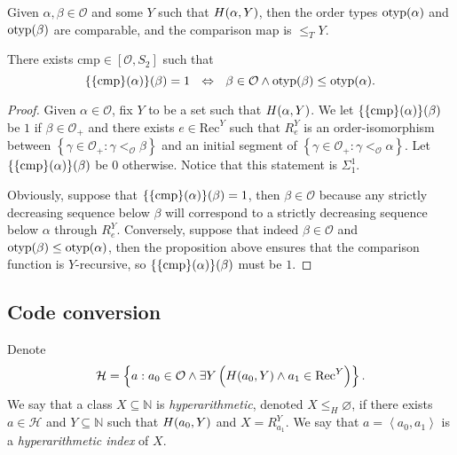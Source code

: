 \documentclass[11pt]{article}
\theoremstyle{plain}
\theoremstyle{definition}
\newcommand{\tuple}[1]{\left\langle #1 \right\rangle}
\newcommand{\Rec}{\mathrm{Rec}}
\DeclareMathOperator{\otyp}{otyp}
\begin{document}
\begin{proposition}
    Given $\alpha, \beta \in \mathcal{O}$ and some $Y$ such that $H\mleft(\alpha, Y\mright)$, then the order types $\otyp\mleft(\alpha\mright)$ and $\otyp\mleft(\beta\mright)$ are comparable, and the comparison map is $\leq_T Y$.
\end{proposition}

\begin{corollary}
    \label{cor:well-order-cmp}
    There exists $\mathrm{cmp} \in \left[\mathcal{O}, S_2\right]$ such that
    \[\mleft\{\mleft\{\mathrm{cmp}\mright\}\mleft(\alpha\mright)\mright\}\mleft(\beta\mright) = 1 \ \ \Leftrightarrow \ \ \beta \in \mathcal{O} \land \otyp\mleft(\beta\mright) \leq \otyp\mleft(\alpha\mright).\]
\end{corollary}

\begin{proof}
    Given $\alpha \in \mathcal{O}$, fix $Y$ to be a set such that $H\mleft(\alpha, Y\mright)$. We let $\mleft\{\mleft\{\mathrm{cmp}\mright\}\mleft(\alpha\mright)\mright\}\mleft(\beta\mright)$ be $1$ if $\beta \in \mathcal{O}_+$ and there exists $e \in \Rec^Y$ such that $R^Y_e$ is an order-isomorphism between $\left\{\gamma \in \mathcal{O}_+ : \gamma <_\mathcal{O} \beta\right\}$ and an initial segment of $\left\{\gamma \in \mathcal{O}_+ : \gamma <_\mathcal{O} \alpha\right\}$. Let $\mleft\{\mleft\{\mathrm{cmp}\mright\}\mleft(\alpha\mright)\mright\}\mleft(\beta\mright)$ be $0$ otherwise. Notice that this statement is $\Sigma^1_1$.

    Obviously, suppose that $\mleft\{\mleft\{\mathrm{cmp}\mright\}\mleft(\alpha\mright)\mright\}\mleft(\beta\mright) = 1$, then $\beta \in \mathcal{O}$ because any strictly decreasing sequence below $\beta$ will correspond to a strictly decreasing sequence below $\alpha$ through $R^Y_e$. Conversely, suppose that indeed $\beta \in \mathcal{O}$ and $\otyp\mleft(\beta\mright) \leq \otyp\mleft(\alpha\mright)$, then the proposition above ensures that the comparison function is $Y$-recursive, so $\mleft\{\mleft\{\mathrm{cmp}\mright\}\mleft(\alpha\mright)\mright\}\mleft(\beta\mright)$ must be $1$.
\end{proof}

\subsection{Code conversion}

Denote
\[\mathcal{H} = \left\{a : a_0 \in \mathcal{O} \land \exists Y \left(H\mleft(a_0, Y\mright) \land a_1 \in \Rec^Y\right)\right\}.\]
We say that a class $X \subseteq \mathbb{N}$ is \emph{hyperarithmetic}, denoted $X \leq_H \varnothing$, if there exists $a \in \mathcal{H}$ and $Y \subseteq \mathbb{N}$ such that $H\mleft(a_0, Y\mright)$ and $X = R^Y_{a_1}$. We say that $a = \tuple{a_0, a_1}$ is a \emph{hyperarithmetic index} of $X$.
\end{document}
